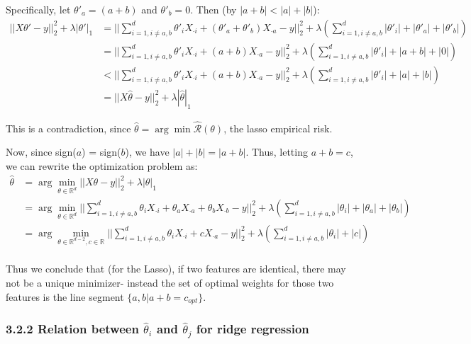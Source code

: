 \documentclass[paper=a4, fontsize=11pt]{scrartcl} %
\numberwithin{equation}{section} %
\numberwithin{figure}{section} %
\numberwithin{table}{section} %
\begin{document}
Specifically, let $\theta'_a = (a + b)$ and $\theta'_b = 0$. Then (by $|a + b| < |a| + |b|$):
\begin{align*}
||X\theta' - y||_2^2 + \lambda |\theta'|_1 &= ||\sum_{i=1, i \ne a, b}^d \theta'_i X_{\cdot i} +  (\theta'_a  + \theta'_b) X_{\cdot a}- y||_2^2 + \lambda \left(\sum_{i=1, i \ne a, b}^d |\theta'_i| + |\theta'_a| + |\theta'_b| \right)  \\
	&=  ||\sum_{i=1, i \ne a, b}^d \theta'_i X_{\cdot i} +  (a + b) X_{\cdot a}- y||_2^2 + \lambda \left(\sum_{i=1, i \ne a, b}^d |\theta'_i| + |a+b| + |0| \right)  \\
	&<  ||\sum_{i=1, i \ne a, b}^d \theta'_i X_{\cdot i} +  (a + b) X_{\cdot a}- y||_2^2 + \lambda \left(\sum_{i=1, i \ne a, b}^d |\theta'_i| + |a| + |b| \right) \\
	&= ||X\hat{\theta} - y||_2^2 + \lambda |\hat{\theta}|_1
\end{align*}

This is a contradiction, since $\hat{\theta} = \arg \min \mathcal{\hat{R}}(\theta)$, the lasso empirical risk.

Now, since sign($a$) = sign($b$), we have $|a| + |b| = |a+b|$. Thus, letting $a + b = c$, we can rewrite the optimization problem as:
\begin{align*}
\hat{\theta} &= \arg \min_{\theta \in \mathbb{R}^d} ||X\theta - y||_2^2 + \lambda |\theta|_1 \\
	&= \arg \min_{\theta \in \mathbb{R}^d} ||\sum_{i=1, i \ne a, b}^d \theta_i X_{\cdot i} + \theta_a X_{\cdot a} +  \theta_b X_{\cdot b}- y||_2^2 + \lambda \left(\sum_{i=1, i \ne a, b}^d |\theta_i| + |\theta_a| + |\theta_b| \right)  \\
	&= \arg \min_{\theta \in \mathbb{R}^{d-2}, c \in \mathbb{R}} ||\sum_{i=1, i \ne a, b}^d \theta_i X_{\cdot i} +  c X_{\cdot a}- y||_2^2 + \lambda \left(\sum_{i=1, i \ne a, b}^d |\theta_i| + |c| \right)  \\
\end{align*}

Thus we conclude that (for the Lasso), if two features are identical, there may not be a unique minimizer- instead the set of optimal weights for those two features is the line segment $\{a, b | a + b = c_{opt}\}$.

\subsubsection*{3.2.2 Relation between $\hat{\theta}_i$ and $\hat{\theta}_j$ for ridge regression}
\end{document}
